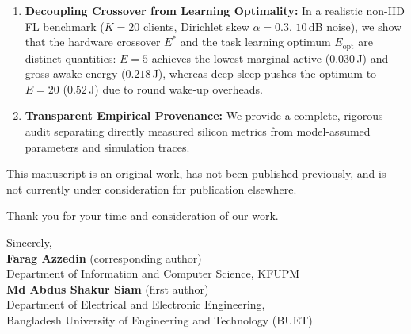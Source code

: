 \documentclass[11pt,a4paper]{article}
\begin{document}
\begin{enumerate}
    \item \textbf{Decoupling Crossover from Learning Optimality:} In a realistic non-IID FL benchmark ($K=20$ clients, Dirichlet skew $\alpha=0.3$, $10$\,dB noise), we show that the hardware crossover $E^*$ and the task learning optimum $E_{\text{opt}}$ are distinct quantities: $E=5$ achieves the lowest marginal active ($0.030$\,J) and gross awake energy ($0.218$\,J), whereas deep sleep pushes the optimum to $E=20$ ($0.52$\,J) due to round wake-up overheads.
    \item \textbf{Transparent Empirical Provenance:} We provide a complete, rigorous audit separating directly measured silicon metrics from model-assumed parameters and simulation traces.
\end{enumerate}

\vspace{0.5em}
\noindent
This manuscript is an original work, has not been published previously, and is not currently under consideration for publication elsewhere.

\vspace{0.5em}
\noindent
Thank you for your time and consideration of our work.

\vspace{1.5em}
\noindent
Sincerely,\\[1em]
\textbf{Farag Azzedin} (corresponding author) \\
Department of Information and Computer Science, KFUPM \\[1em]
\textbf{Md Abdus Shakur Siam} (first author) \\
Department of Electrical and Electronic Engineering, \\
Bangladesh University of Engineering and Technology (BUET)
\end{document}

